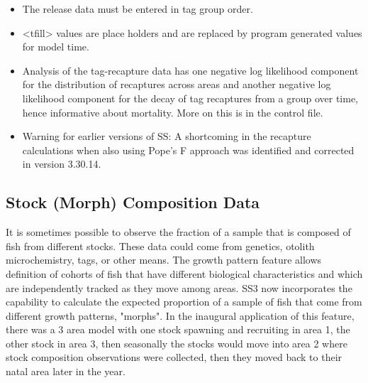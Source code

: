 	\begin{itemize}
		\item The release data must be entered in tag group order.
		\item <tfill> values are place holders and are replaced by program generated values for model time.
		\item Analysis of the tag-recapture data has one negative log likelihood component for the distribution of recaptures across areas and another negative log likelihood component for the decay of tag recaptures from a group over time, hence informative about mortality.  More on this is in the control file.
		\item Warning for earlier versions of SS: A shortcoming in the recapture calculations when also using Pope's F approach was identified and corrected in version 3.30.14.
	\end{itemize}

\subsection{Stock (Morph) Composition Data}
It is sometimes possible to observe the fraction of a sample that is composed of fish from different stocks. These data could come from genetics, otolith microchemistry, tags, or other means.  The growth pattern feature allows definition of cohorts of fish that have different biological characteristics and which are independently tracked as they move among areas. SS3 now incorporates the capability to calculate the expected proportion of a sample of fish that come from different growth patterns, "morphs". In the inaugural application of this feature, there was a 3 area model with one stock spawning and recruiting in area 1, the other stock in area 3, then seasonally the stocks would move into area 2 where stock composition observations were collected, then they moved back to their natal area later in the year.

